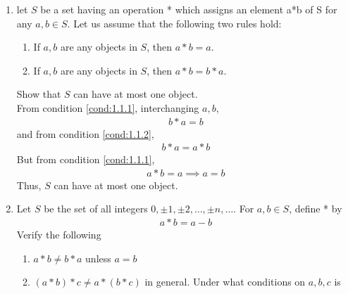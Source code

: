 
\renewcommand{\theequation}{\theenumi}
\begin{enumerate}[label=\arabic*.,ref=\thesubsection.\theenumi]


	\item let $S$ be a set having an operation * which assigns an element a*b of S for any $a,b \in S$. Let us assume that the following two rules hold:
		\begin{enumerate}
			\item If $a,b$ are any objects in $S$, then $a*b = a$.
				\label{cond:1.1.1}
			\item If $a,b$ are any objects in $S$, then $a*b = b*a$.
				\label{cond:1.1.2}
		\end{enumerate}
		Show that $S$ can have at most one object.
		\\
		\solution From condition
				\ref{cond:1.1.1}, interchanging $a, b$, 
		\begin{align}
			b*a = b
		\end{align}
		and from condition
				\ref{cond:1.1.2},
		\begin{align}
			b*a = a*b 
		\end{align}
		But from condition \ref{cond:1.1.1}, 
		\begin{align}
			a*b = a \implies a = b
		\end{align}
		Thus, $S$ can have at most one object.
	\item Let $S$ be the set of all integers $0, \pm 1, \pm 2, \dots, \pm n, \dots$.  For $a, b \in S$, define * by
		\begin{align}
			a*b = a-b
		\end{align}
		Verify the following
		\begin{enumerate}
			\item $a*b \ne b*a $ unless $a = b$
			\item $(a*b)*c \ne a*(b*c)$ in general.  Under what conditions on $a, b, c$ is 

\end{enumerate}
\end{enumerate}
